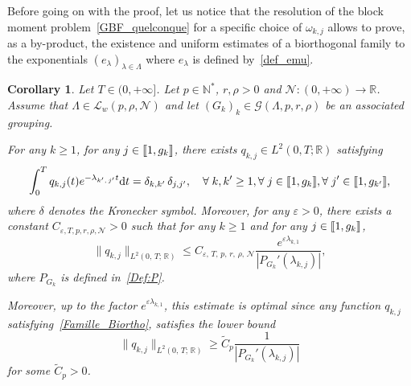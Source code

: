 \documentclass[11pt]{article}
\newtheorem{coro}[theo]{Corollary}
\theoremstyle{definition}
\numberwithin{equation}{section}
\numberwithin{figure}{section}
\numberwithin{table}{section}
\newcommand{\llbracket}{\mathopen{[\mkern -2.7mu[}}
\newcommand{\rrbracket}{\mathclose{]\mkern -2.7mu]}}
\newcommand{\inter}[2]{\llbracket #1,#2 \rrbracket}
\newcommand{\n}{g}
\newcommand{\LL}{\mathcal{L}}
\newcommand{\NN}{\mathcal{N}}
\newcommand{\N}{\mathbb{N}}
\newcommand{\R}{\mathbb{R}}
\newcommand{\md}{\mathrm{d}}
\let\oldforall\forall
\renewcommand*{\forall}{\mathrel{\oldforall}}
\begin{document}
Before going on with the proof, let us notice that the resolution of the block moment problem~\eqref{GBF_quelconque} for a specific choice of $\omega_{k,j}$ allows to prove, as a by-product, the existence and uniform estimates of a biorthogonal family to the exponentials $(e_\lambda)_{ \lambda \in \Lambda}$ where $e_\lambda$ is defined by~\eqref{def_emu}.
\begin{coro} \label{Coro:FamilleBiorthogonale}
Let $T \in (0,+\infty]$. Let $p \in \N^*$, $r, \rho > 0$ and $\NN : (0,+\infty) \to \R$. Assume that $\Lambda \in \LL_w(p,\rho, \NN)$ and let $(G_k)_k\in \mathcal{G}(\Lambda,p,r,\rho)$ be an associated grouping.

For any $k \geq 1$, for any $j \in \inter{1}{\n_k}$, there exists $q_{k,j} \in L^2(0,T ; \R)$ satisfying
\begin{equation}\label{Famille_Biortho}
\int_0^T q_{k,j}(t) e^{-\lambda_{k',\,j'} t } \md t = \delta_{k,k'}\,\delta_{j,j'}, \quad \forall k, k' \geq 1, \forall j \in \inter{1}{\n_{k}}, \forall j' \in \inter{1}{\n_{k'}},
\end{equation}
where $\delta$ denotes the Kronecker symbol. Moreover, for any $\varepsilon > 0$, there exists a constant $C_{\varepsilon, T, p, r, \rho, \NN} >0$ such that for any $k \geq 1$ and for any $j \in \inter{1}{\n_k}$,
\begin{equation*}\label{Estimee_Famille_Biortho}
\| q_{k,j} \|_{L^2(0,\,T ;\,\R)} \leq C_{\varepsilon,\,T,\,p,\,r,\,\rho,\,\NN} \frac{e^{\varepsilon \lambda_{k,1}}}{\left| P_{G_k}'(\lambda_{k,j}) \right| },
\end{equation*}
where $P_{G_k}$ is defined in~\eqref{Def:P}.

Moreover, up to the factor $e^{\varepsilon \lambda_{k,1}}$, this estimate is optimal since any function $q_{k,j}$ satisfying~\eqref{Famille_Biortho}, satisfies the lower bound
\[
\| q_{k,j} \|_{L^2(0,\,T ;\,\R)} \geq \widetilde{C}_{p} \frac{1}{\left| P_{G_k}'(\lambda_{k,j}) \right| }
\]
for some $\widetilde{C}_p >0$.
\end{coro}
\end{document}
